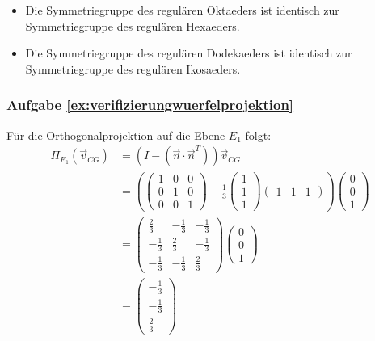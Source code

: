 \begin{itemize}
\item[c)] Die Symmetriegruppe des regulären Oktaeders ist identisch zur Symmetriegruppe des regulären Hexaeders. 
\item[d)] Die Symmetriegruppe des regulären Dodekaeders ist identisch zur Symmetriegruppe des regulären Ikosaeders. 
\end{itemize}


\subsubsection*{Aufgabe \ref{ex:verifizierungwuerfelprojektion}}
Für die Orthogonalprojektion auf die Ebene $E_1$ folgt:
\begin{align}
        \Pi_{E_1}(\vec{v}_{CG}) &= \left(I - (\vec{n} \cdot \vec{n}^T)\right) \vec{v}_{CG} \nonumber \\
        &= \left(\left(\begin{matrix}
            1 & 0 & 0 \\
            0 & 1 & 0 \\
            0 & 0 & 1
            \end{matrix}\right) - \frac{1}{3}\begin{pmatrix} 1 \\ 1 \\ 1 \end{pmatrix} \begin{pmatrix} 1 & 1 & 1 \end{pmatrix}\right) \begin{pmatrix} 0 \\ 0 \\ 1 \end{pmatrix} \nonumber \\
        &= \left(\begin{matrix}
            \frac{2}{3} & -\frac{1}{3} & -\frac{1}{3} \\
            -\frac{1}{3} & \frac{2}{3} & -\frac{1}{3} \\
            -\frac{1}{3} & -\frac{1}{3} & \frac{2}{3}
            \end{matrix}\right)\begin{pmatrix} 0 \\ 0 \\ 1 \end{pmatrix} \nonumber \\
            &=\begin{pmatrix} -\frac{1}{3} \\ -\frac{1}{3} \\ \frac{2}{3} \end{pmatrix} \nonumber
    \end{align}


